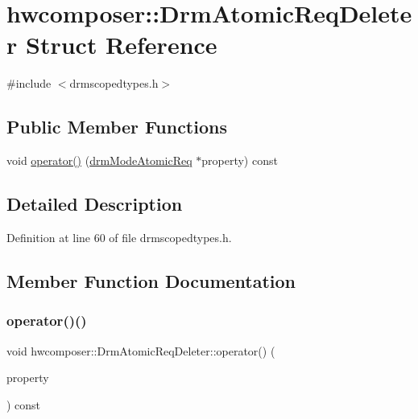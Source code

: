 \hypertarget{structhwcomposer_1_1DrmAtomicReqDeleter}{}\section{hwcomposer\+:\+:Drm\+Atomic\+Req\+Deleter Struct Reference}
\label{structhwcomposer_1_1DrmAtomicReqDeleter}


{\ttfamily \#include $<$drmscopedtypes.\+h$>$}

\subsection*{Public Member Functions}
\begin{DoxyCompactItemize}
\item 
void \mbox{\hyperlink{structhwcomposer_1_1DrmAtomicReqDeleter_aaeed58939f975e58157cac39ade689f7}{operator()}} (\mbox{\hyperlink{drmscopedtypes_8h_a6d8c8b40283089c14de1005f7fb2ee0c}{drm\+Mode\+Atomic\+Req}} $\ast$property) const
\end{DoxyCompactItemize}


\subsection{Detailed Description}


Definition at line 60 of file drmscopedtypes.\+h.



\subsection{Member Function Documentation}
\mbox{\label{structhwcomposer_1_1DrmAtomicReqDeleter_aaeed58939f975e58157cac39ade689f7}} 
\subsubsection{\texorpdfstring{operator()()}{operator()()}}
{\footnotesize\ttfamily void hwcomposer\+::\+Drm\+Atomic\+Req\+Deleter\+::operator() (\begin{DoxyParamCaption}\item[{\mbox{\hyperlink{drmscopedtypes_8h_a6d8c8b40283089c14de1005f7fb2ee0c}{drm\+Mode\+Atomic\+Req}} $\ast$}]{property }\end{DoxyParamCaption}) const}



